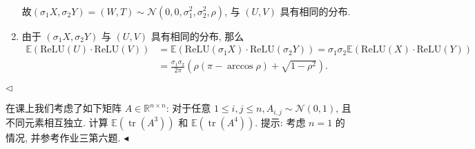 \documentclass[11pt]{article}
\newenvironment{problem}[2][Problem]{\begin{trivlist}
    \item[\hskip \labelsep {\bfseries #1}\hskip \labelsep {\bfseries #2.}]\songti}{\hfill$\blacktriangleleft$\end{trivlist}}
\newenvironment{answer}[1][Solution]{\begin{trivlist}
    \item[\hskip \labelsep {\bfseries #1.}\hskip \labelsep]}{\hfill$\lhd$\end{trivlist}}
\newcommand\1{\mathds{1}}
\newcommand\R{\mathbb{R}}
\newcommand\E{\mathbb{E}}
\newcommand\ReLU{\mathrm{ReLU}}
\DeclareMathOperator{\tr}{tr}
\begin{document}
\begin{answer}
\begin{enumerate}[label=(\arabic*)]
\begin{align*}
        \end{align*}
        故$(\sigma_1X, \sigma_2Y)=(W,T) \sim \mathcal{N}(0,0,\sigma_1^2,\sigma_2^2,\rho)$, 与 $(U,V)$ 具有相同的分布.
        \item 由于 $(\sigma_1X, \sigma_2Y)$ 与 $(U,V)$ 具有相同的分布, 那么
        \begin{align*}
            \E(\ReLU(U)\cdot\ReLU(V)) &= \E(\ReLU(\sigma_1 X)\cdot\ReLU(\sigma_2 Y)) = \sigma_1 \sigma_2 \E(\ReLU(X)\cdot\ReLU(Y)) \\
            &= \frac{\sigma_1\sigma_2}{2\pi} \left(\rho(\pi - \arccos\rho) + \sqrt{1-\rho^2}\right).
        \end{align*}
    \end{enumerate}
\end{answer}

\begin{problem}{3}
    在课上我们考虑了如下矩阵 $A \in \R^{n\times n}$: 对于任意 $1\le i,j \le n, A_{i,j} \sim \mathcal{N}(0,1)$, 且不同元素相互独立. 
    计算 $\E(\tr(A^3))$ 和 $\E(\tr(A^4))$. {\kaishu 提示: 考虑 $n=1$ 的情况, 并参考作业三第六题.}
\end{problem}
\end{document}
